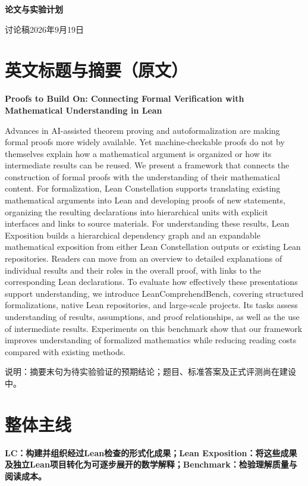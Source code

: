 \documentclass[UTF8,10pt,fontset=none]{ctexart}
\begin{document}
\begin{center}
{\LARGE\bfseries 论文与实验计划}\par
{\small 讨论稿\quad 2026年9月19日}
\end{center}
\section*{英文标题与摘要（原文）}
{\large\bfseries Proofs to Build On: Connecting Formal Verification with Mathematical Understanding in Lean}\par
\begingroup\small
Advances in AI-assisted theorem proving and autoformalization are making formal proofs more widely available. Yet machine-checkable proofs do not by themselves explain how a mathematical argument is organized or how its intermediate results can be reused. We present a framework that connects the construction of formal proofs with the understanding of their mathematical content. For formalization, Lean Constellation supports translating existing mathematical arguments into Lean and developing proofs of new statements, organizing the resulting declarations into hierarchical units with explicit interfaces and links to source materials. For understanding these results, Lean Exposition builds a hierarchical dependency graph and an expandable mathematical exposition from either Lean Constellation outputs or existing Lean repositories. Readers can move from an overview to detailed explanations of individual results and their roles in the overall proof, with links to the corresponding Lean declarations. To evaluate how effectively these presentations support understanding, we introduce LeanComprehendBench, covering structured formalizations, native Lean repositories, and large-scale projects. Its tasks assess understanding of results, assumptions, and proof relationships, as well as the use of intermediate results. Experiments on this benchmark show that our framework improves understanding of formalized mathematics while reducing reading costs compared with existing methods.
\endgroup

{\small\color{accent}说明：摘要末句为待实验验证的预期结论；题目、标准答案及正式评测尚在建设中。}

\section*{整体主线}
\textbf{LC：构建并组织经过Lean检查的形式化成果；Lean Exposition：将这些成果及独立Lean项目转化为可逐步展开的数学解释；Benchmark：检验理解质量与阅读成本。}
\end{document}
